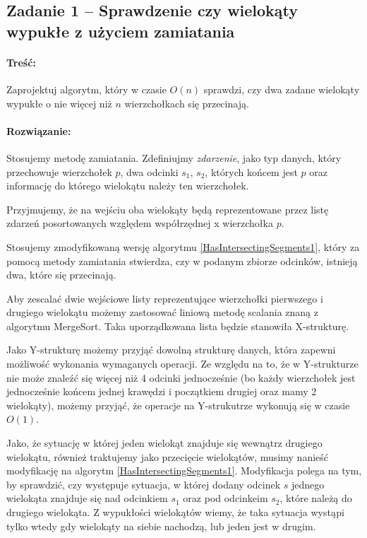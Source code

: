 
\subsection{Zadanie 1 -- Sprawdzenie czy wielokąty wypukłe z użyciem zamiatania} 
\paragraph{Treść:} Zaprojektuj algorytm, który w 
czasie $O(n)$ sprawdzi, czy dwa zadane wielokąty wypukłe o nie więcej
niż $n$ wierzchołkach się przecinają. 

\paragraph{Rozwiązanie:}
Stosujemy metodę zamiatania. Zdefiniujmy \textit{zdarzenie},
jako typ danych, który przechowuje wierzchołek $p$, dwa
odcinki $s_1$, $s_2$, których końcem jest $p$ oraz informację 
do którego wielokątu należy ten wierzchołek.

Przyjmujemy, że na wejściu oba wielokąty będą
reprezentowane przez listę zdarzeń posortowanych
względem współrzędnej x wierzchołka $p$. 

Stosujemy zmodyfikowaną wersję algorytmu \ref{HasIntersectingSegments1}, który za 
pomocą metody zamiatania stwierdza, czy w podanym
zbiorze odcinków, istnieją dwa, które się przecinają.  

Aby zescalać dwie wejściowe listy reprezentujące wierzchołki pierwszego
i drugiego wielokątu możemy zastosować liniową metodę scalania
znaną z algorytmu MergeSort. Taka uporządkowana lista
będzie stanowiła X-strukturę.

Jako Y-strukturę możemy przyjąć dowolną strukturę danych, która
zapewni możliwość wykonania wymaganych operacji. Ze względu 
na to, że w Y-strukturze nie może znaleźć się więcej niż 
4 odcinki jednocześnie (bo każdy wierzchołek jest jednocześnie
końcem jednej krawędzi i początkiem drugiej oraz mamy 
2 wielokąty), możemy przyjąć, że operacje na Y-strukutrze wykonują się w czasie $O(1)$.

Jako, że sytuację w której jeden wielokąt znajduje się wewnątrz drugiego
wielokątu, również traktujemy jako przecięcie wielokątów, musimy nanieść modyfikację
na algorytm \ref{HasIntersectingSegments1}. Modyfikacja polega na tym, by 
sprawdzić, czy występuje sytuacja, w której dodany odcinek $s$
jednego wielokąta znajduje się nad odcinkiem $s_1$ oraz pod odcinkeim $s_2$,
które należą do drugiego wielokąta. Z wypukłości wielokątów wiemy, że 
taka sytuacja wystąpi tylko wtedy gdy wielokąty na siebie nachodzą, lub
jeden jest w drugim.
 
